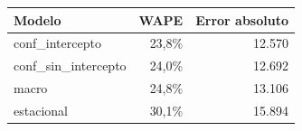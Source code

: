\begin{tabular}{lrr}
\toprule
Modelo & WAPE & Error absoluto \\
\midrule
conf\_intercepto & 23,8\% & 12.570 \\
conf\_sin\_intercepto & 24,0\% & 12.692 \\
macro & 24,8\% & 13.106 \\
estacional & 30,1\% & 15.894 \\
\bottomrule
\end{tabular}
